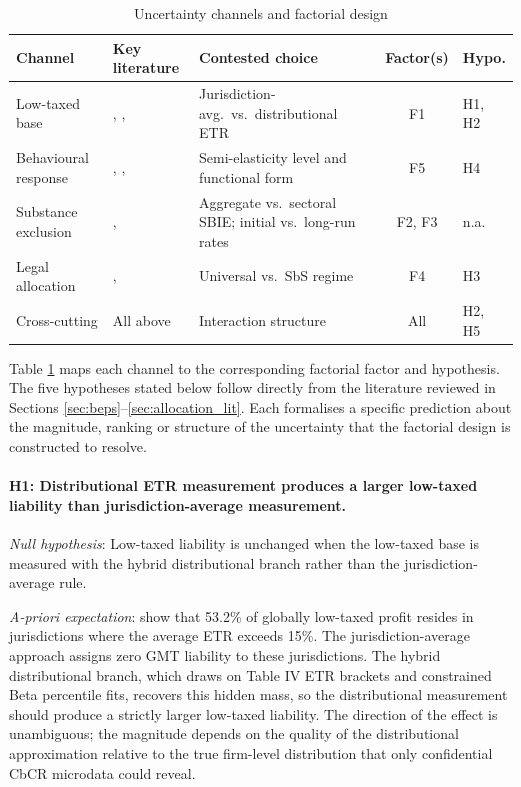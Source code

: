 \documentclass[11pt,a4paper]{article}
\begin{document}
\begin{table}[H]
\centering
\caption{Uncertainty channels and factorial design}
\label{tab:channels}
\small
\begin{tabular}{@{}p{2.8cm}p{3.5cm}p{3.2cm}cp{1.2cm}@{}}
\toprule
Channel & Key literature & Contested choice & Factor(s) & Hypo. \\
\midrule
Low-taxed base & \citet{hugger2026}, \citet{barake2022}, \citet{blouin2023} & Jurisdiction-avg.\ vs.\ distributional ETR & F1 & H1, H2 \\
Behavioural response & \citet{heckemeyer2017}, \citet{dowd2017}, \citet{garcia-bernardo2024} & Semi-elasticity level and functional form & F5 & H4 \\
Substance exclusion & \citet{devereux2023}, \citet{schjelderup2024} & Aggregate vs.\ sectoral SBIE; initial vs.\ long-run rates & F2, F3 & n.a. \\
Legal allocation & \citet{devereux2022}, \citet{oecd2026} & Universal vs.\ SbS regime & F4 & H3 \\
Cross-cutting & All above & Interaction structure & All & H2, H5 \\
\bottomrule
\end{tabular}
\end{table}

Table \ref{tab:channels} maps each channel to the corresponding factorial factor and hypothesis. The five hypotheses stated below follow directly from the literature reviewed in Sections \ref{sec:beps}--\ref{sec:allocation_lit}. Each formalises a specific prediction about the magnitude, ranking or structure of the uncertainty that the factorial design is constructed to resolve.

\paragraph{H1: Distributional ETR measurement produces a larger low-taxed liability than jurisdiction-average measurement.}

\noindent\textit{Null hypothesis}: Low-taxed liability is unchanged when the low-taxed base is measured with the hybrid distributional branch rather than the jurisdiction-average rule.

\noindent\textit{A-priori expectation}: \citet{hugger2026} show that 53.2\% of globally low-taxed profit resides in jurisdictions where the average ETR exceeds 15\%. The jurisdiction-average approach assigns zero GMT liability to these jurisdictions. The hybrid distributional branch, which draws on Table IV ETR brackets and constrained Beta percentile fits, recovers this hidden mass, so the distributional measurement should produce a strictly larger low-taxed liability. The direction of the effect is unambiguous; the magnitude depends on the quality of the distributional approximation relative to the true firm-level distribution that only confidential CbCR microdata could reveal.
\end{document}

